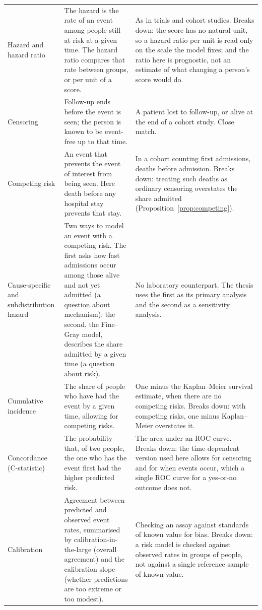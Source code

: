 \begin{longtable}{>{\raggedright\arraybackslash}p{2.7cm} >{\raggedright\arraybackslash}p{4.6cm} >{\raggedright\arraybackslash}p{6.6cm}}
\addlinespace
Hazard and hazard ratio & The hazard is the rate of an event among people still at risk at a given time. The hazard ratio compares that rate between groups, or per unit of a score. & As in trials and cohort studies. Breaks down: the score has no natural unit, so a hazard ratio per unit is read only on the scale the model fixes; and the ratio here is prognostic, not an estimate of what changing a person's score would do. \\
Censoring & Follow-up ends before the event is seen; the person is known to be event-free up to that time. & A patient lost to follow-up, or alive at the end of a cohort study. Close match. \\
Competing risk & An event that prevents the event of interest from being seen. Here death before any hospital stay prevents that stay. & In a cohort counting first admissions, deaths before admission. Breaks down: treating such deaths as ordinary censoring overstates the share admitted (Proposition~\ref{prop:competing}). \\
Cause-specific and subdistribution hazard & Two ways to model an event with a competing risk. The first asks how fast admissions occur among those alive and not yet admitted (a question about mechanism); the second, the Fine--Gray model, describes the share admitted by a given time (a question about risk). & No laboratory counterpart. The thesis uses the first as its primary analysis and the second as a sensitivity analysis. \\
Cumulative incidence & The share of people who have had the event by a given time, allowing for competing risks. & One minus the Kaplan--Meier survival estimate, when there are no competing risks. Breaks down: with competing risks, one minus Kaplan--Meier overstates it. \\
Concordance (C-statistic) & The probability that, of two people, the one who has the event first had the higher predicted risk. & The area under an ROC curve. Breaks down: the time-dependent version used here allows for censoring and for when events occur, which a single ROC curve for a yes-or-no outcome does not. \\
Calibration & Agreement between predicted and observed event rates, summarised by calibration-in-the-large (overall agreement) and the calibration slope (whether predictions are too extreme or too modest). & Checking an assay against standards of known value for bias. Breaks down: a risk model is checked against observed rates in groups of people, not against a single reference sample of known value. \\

\end{longtable}
